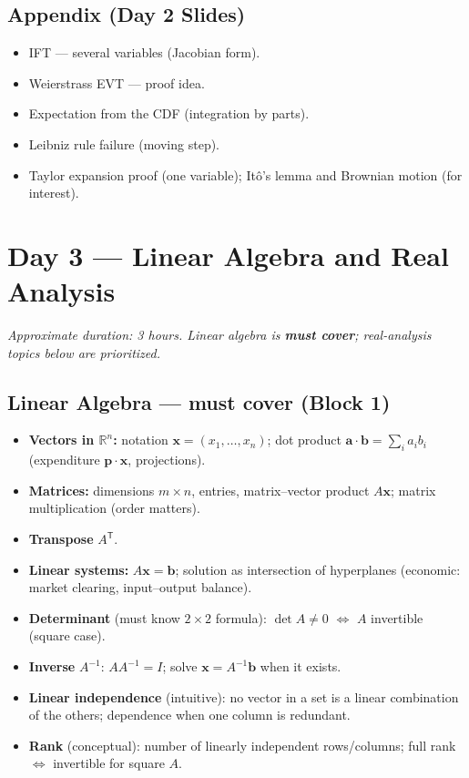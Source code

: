 \documentclass[11pt,a4paper]{article}
\begin{document}
\subsection{Appendix (Day 2 Slides)}
\begin{itemize}[leftmargin=*]
    \item IFT --- several variables (Jacobian form).
    \item Weierstrass EVT --- proof idea.
    \item Expectation from the CDF (integration by parts).
    \item Leibniz rule failure (moving step).
    \item Taylor expansion proof (one variable); It\^o's lemma and Brownian motion (for interest).
\end{itemize}

\section{Day 3 --- Linear Algebra and Real Analysis}

\textit{Approximate duration: 3 hours. Linear algebra is \textbf{must cover}; real-analysis topics below are prioritized.}

\subsection{Linear Algebra --- \textbf{must cover (Block 1)}}
\begin{itemize}[leftmargin=*]
    \item \textbf{Vectors in $\mathbb{R}^n$:} notation $\mathbf{x}=(x_1,\ldots,x_n)$;
      dot product $\mathbf{a}\cdot\mathbf{b}=\sum_i a_i b_i$ (expenditure $\mathbf{p}\cdot\mathbf{x}$, projections).
    \item \textbf{Matrices:} dimensions $m\times n$, entries, matrix--vector product $A\mathbf{x}$;
      matrix multiplication (order matters).
    \item \textbf{Transpose} $A^{\mathsf T}$.
    \item \textbf{Linear systems:} $A\mathbf{x}=\mathbf{b}$; solution as intersection of hyperplanes
      (economic: market clearing, input--output balance).
    \item \textbf{Determinant} (must know $2\times 2$ formula):
      $\det A\neq 0$ $\Leftrightarrow$ $A$ invertible (square case).
    \item \textbf{Inverse} $A^{-1}$: $AA^{-1}=I$; solve $\mathbf{x}=A^{-1}\mathbf{b}$ when it exists.
    \item \textbf{Linear independence} (intuitive): no vector in a set is a linear combination of the others;
      dependence when one column is redundant.
    \item \textbf{Rank} (conceptual): number of linearly independent rows/columns;
      full rank $\Leftrightarrow$ invertible for square $A$.
\end{itemize}
\end{document}
